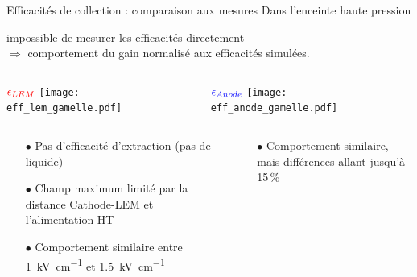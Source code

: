     \begin{frame}{Efficacités de collection : comparaison aux mesures}
        Dans l'enceinte haute pression
        \begin{scriptsize}
            impossible de mesurer les efficacités directement \\$\Rightarrow$ comportement du gain normalisé aux efficacités simulées.
        \begin{columns}
            \begin{column}{0.5\textwidth}
                \centering $\textcolor{red}{\epsilon_{LEM}}$
                \texttt{[image: eff\_lem\_gamelle.pdf]}
            \end{column}\hfill
            \begin{column}{0.5\textwidth}
                \centering $\textcolor{blue}{\epsilon_{Anode}}$
                \texttt{[image: eff\_anode\_gamelle.pdf]}
            \end{column}
        \end{columns}
   		\begin{columns}
            \begin{column}{0.5\textwidth}
                \begin{itemize}
                    \item[$\bullet$] Pas d'efficacité d'extraction (pas de liquide)
                    \item[$\bullet$] Champ maximum limité par la distance Cathode-LEM et l'alimentation HT
                    \item[$\bullet$] Comportement similaire entre \SI{1}{\kilo\volt\per\centi\meter} et \SI{1.5}{\kilo\volt\per\centi\meter}
                \end{itemize}
            \end{column}\hfill
            \begin{column}{0.5\textwidth}
                \begin{itemize}
                    \item[$\bullet$] Comportement similaire, mais différences allant jusqu'à 15\,\%
                \end{itemize}
            \end{column}
        \end{columns}
        \end{scriptsize}
    \end{frame}

